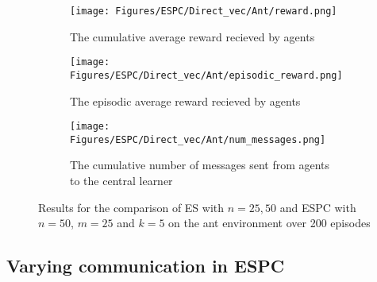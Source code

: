 \begin{figure}
    \centering
    \begin{subfigure}{0.5\textwidth}
        \centering
        \texttt{[image: Figures/ESPC/Direct\_vec/Ant/reward.png]}
        \caption{The cumulative average reward recieved by agents}
        \label{fig:AntReward}
    \end{subfigure}
    \begin{subfigure}{0.5\textwidth}
        \centering
        \texttt{[image: Figures/ESPC/Direct\_vec/Ant/episodic\_reward.png]}
        \caption{The episodic average reward recieved by agents}
        \label{fig:AntEpisodicReward}
    \end{subfigure}
    \begin{subfigure}{0.5\textwidth}
        \centering
        \texttt{[image: Figures/ESPC/Direct\_vec/Ant/num\_messages.png]}
        \caption{The cumulative number of messages sent from agents to the central learner}
        \label{fig:AntMessages}
    \end{subfigure}
    \caption{Results for the comparison of ES with $n=25,50$ and ESPC with $n=50$, $m=25$ and $k=5$ on the ant environment over 200 episodes}
    \label{fig:DirectAnt}
\end{figure}


\subsection{Varying communication in ESPC}

